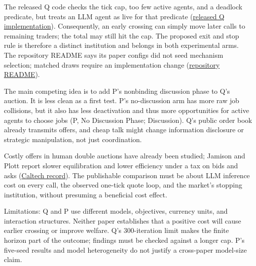 The released Q code checks the tick cap, too few active agents, and a
deadlock predicate, but treats an LLM agent as live for that predicate
(\href{https://github.com/jswistak/competitive-market-simulation/blob/master/src/%
market_simulation/graph/nodes/control.py}{released Q implementation}).
Consequently, an early crossing can simply move later calls to remaining
traders; the total may still hit the cap. The proposed exit and stop rule is
therefore a distinct institution and belongs in both experimental arms.
The repository README says its paper configs did not seed mechanism selection;
matched draws require an implementation change
(\href{https://github.com/jswistak/competitive-market-simulation}{repository README}).

The main competing idea is to add P's nonbinding discussion phase to Q's
auction. It is less clean as a first test. P's no-discussion arm has more raw
job collisions, but it also has less deactivation and thus more opportunities
for active agents to choose jobs (P, No Discussion Phase; Discussion). Q's
public order book already transmits offers, and cheap talk might change
information disclosure or strategic manipulation, not just coordination.

Costly offers in human double auctions have already been studied; Jamison and
Plott report slower equilibration and lower efficiency under a tax on bids
and asks
(\href{https://authors.library.caltech.edu/records/fnhzb-n0e58}{Caltech record}).
The publishable comparison must be about LLM inference cost on every call,
the observed one-tick quote loop, and the market's stopping institution,
without presuming a beneficial cost effect.

Limitations: Q and P use different models, objectives, currency units, and
interaction structures. Neither paper establishes that a positive cost will
cause earlier crossing or improve welfare. Q's \(300\)-iteration limit makes
the finite horizon part of the outcome; findings must be checked against a
longer cap. P's five-seed results and model heterogeneity do not justify a
cross-paper model-size claim.
